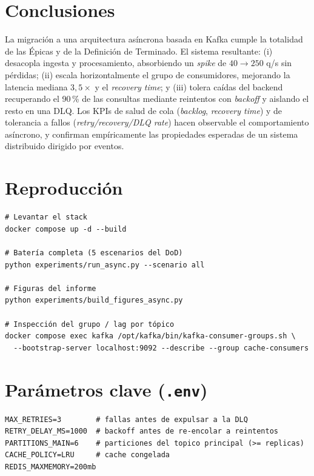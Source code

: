 \documentclass[11pt,a4paper]{article}
\begin{document}
\section{Conclusiones}
La migración a una arquitectura asíncrona basada en Kafka cumple la totalidad de
las Épicas y de la Definición de Terminado. El sistema resultante: (i) desacopla
ingesta y procesamiento, absorbiendo un \emph{spike} de $40\to250$ q/s sin
pérdidas; (ii) escala horizontalmente el grupo de consumidores, mejorando la
latencia mediana $3{,}5\times$ y el \emph{recovery time}; y (iii) tolera caídas
del backend recuperando el 90\,\% de las consultas mediante reintentos con
\emph{backoff} y aislando el resto en una DLQ. Los KPIs de salud de cola
(\emph{backlog}, \emph{recovery time}) y de tolerancia a fallos
(\emph{retry/recovery/DLQ rate}) hacen observable el comportamiento asíncrono, y
confirman empíricamente las propiedades esperadas de un sistema distribuido
dirigido por eventos.

\appendix
\section{Reproducción}
\begin{lstlisting}[caption={Comandos para reproducir la batería}]
# Levantar el stack
docker compose up -d --build

# Batería completa (5 escenarios del DoD)
python experiments/run_async.py --scenario all

# Figuras del informe
python experiments/build_figures_async.py

# Inspección del grupo / lag por tópico
docker compose exec kafka /opt/kafka/bin/kafka-consumer-groups.sh \
  --bootstrap-server localhost:9092 --describe --group cache-consumers
\end{lstlisting}

\section{Parámetros clave (\texttt{.env})}
\begin{lstlisting}
MAX_RETRIES=3        # fallas antes de expulsar a la DLQ
RETRY_DELAY_MS=1000  # backoff antes de re-encolar a reintentos
PARTITIONS_MAIN=6    # particiones del topico principal (>= replicas)
CACHE_POLICY=LRU     # cache congelada
REDIS_MAXMEMORY=200mb
\end{lstlisting}
\end{document}
